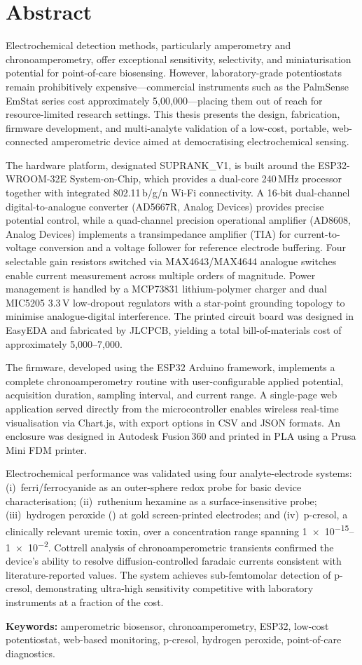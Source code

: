 \chapter*{Abstract}
\thispagestyle{plain}

Electrochemical detection methods, particularly amperometry and chronoamperometry, offer exceptional sensitivity, selectivity, and miniaturisation potential for point-of-care biosensing. However, laboratory-grade potentiostats remain prohibitively expensive---commercial instruments such as the PalmSense EmStat series cost approximately \texttildelow\rupee{}5,00,000---placing them out of reach for resource-limited research settings. This thesis presents the design, fabrication, firmware development, and multi-analyte validation of a low-cost, portable, web-connected amperometric device aimed at democratising electrochemical sensing.

The hardware platform, designated SUPRANK\_V1, is built around the ESP32-WROOM-32E System-on-Chip, which provides a dual-core 240\,MHz processor together with integrated 802.11\,b/g/n Wi-Fi connectivity. A 16-bit dual-channel digital-to-analogue converter (AD5667R, Analog Devices) provides precise potential control, while a quad-channel precision operational amplifier (AD8608, Analog Devices) implements a transimpedance amplifier (TIA) for current-to-voltage conversion and a voltage follower for reference electrode buffering. Four selectable gain resistors switched via MAX4643/MAX4644 analogue switches enable current measurement across multiple orders of magnitude. Power management is handled by a MCP73831 lithium-polymer charger and dual MIC5205 3.3\,V low-dropout regulators with a star-point grounding topology to minimise analogue-digital interference. The printed circuit board was designed in EasyEDA and fabricated by JLCPCB, yielding a total bill-of-materials cost of approximately \texttildelow\rupee{}5,000--7,000.

The firmware, developed using the ESP32 Arduino framework, implements a complete chronoamperometry routine with user-configurable applied potential, acquisition duration, sampling interval, and current range. A single-page web application served directly from the microcontroller enables wireless real-time visualisation via Chart.js, with export options in CSV and JSON formats. An enclosure was designed in Autodesk Fusion\,360 and printed in PLA using a Prusa Mini FDM printer.

Electrochemical performance was validated using four analyte-electrode systems: (i)~ferri/ferrocyanide \ferrocene{} as an outer-sphere redox probe for basic device characterisation; (ii)~ruthenium hexamine \ruhex{} as a surface-insensitive probe; (iii)~hydrogen peroxide () at gold screen-printed electrodes; and (iv)~p-cresol, a clinically relevant uremic toxin, over a concentration range spanning \SIrange{1e-15}{1e-2}{\molar}. Cottrell analysis of chronoamperometric transients confirmed the device's ability to resolve diffusion-controlled faradaic currents consistent with literature-reported values. The system achieves sub-femtomolar detection of p-cresol, demonstrating ultra-high sensitivity competitive with laboratory instruments at a fraction of the cost.

\vspace{0.4cm}
\noindent\textbf{Keywords:} amperometric biosensor, chronoamperometry, ESP32, low-cost potentiostat, web-based monitoring, p-cresol, hydrogen peroxide, point-of-care diagnostics.
